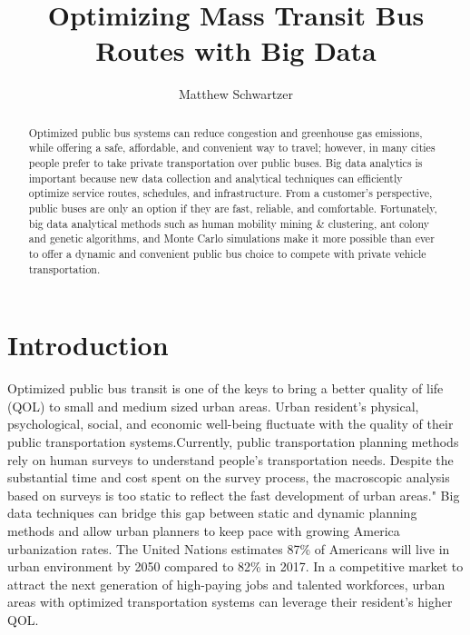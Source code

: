 \documentclass[sigconf]{acmart}
\begin{document}
\title{Optimizing Mass Transit Bus Routes with Big Data}


\author{Matthew Schwartzer}


\begin{abstract}
Optimized public bus systems can reduce congestion and greenhouse gas emissions, while offering a safe, affordable, and convenient way to travel; however, in many cities people prefer to take private transportation over public buses. Big data analytics is important because new data collection and analytical techniques can efficiently optimize service routes, schedules, and infrastructure. From a customer's perspective, public buses are only an option if they are fast, reliable, and comfortable. Fortunately, big data analytical methods such as human mobility mining \& clustering, ant colony and genetic algorithms, and Monte Carlo simulations make it more possible than ever to offer a dynamic and convenient public bus choice to compete with private vehicle transportation. 

\end{abstract}



\maketitle

\section{Introduction}

Optimized public bus transit is one of the keys to bring a better quality of life (QOL) to small and medium sized urban areas. Urban resident's physical, psychological, social, and economic well-being fluctuate with the quality of their public transportation systems\cite{RichardJ01}.Currently, public transportation planning methods rely on human surveys to understand people's transportation needs. Despite the substantial time and cost spent on the survey process, the macroscopic analysis based on surveys is too static to reflect the fast development of urban areas\cite{Liu01}." Big data techniques can bridge this gap between static and dynamic planning methods and allow urban planners to keep pace with growing America urbanization rates. The United Nations estimates 87\% of Americans will live in urban environment by 2050 compared to 82\% in 2017\cite{Boyd01}. In a competitive market to attract the next generation of high-paying jobs and talented workforces, urban areas with optimized transportation systems can leverage their resident's higher QOL. 
\end{document}
